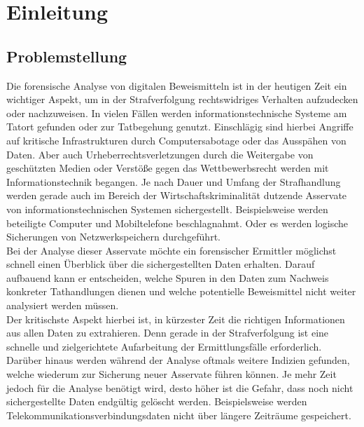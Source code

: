 
\chapter{Einleitung}
\label{ch:einleitung}

\section{Problemstellung}
Die forensische Analyse von digitalen Beweismitteln ist in der heutigen Zeit ein wichtiger Aspekt, um in der Strafverfolgung rechtswidriges Verhalten aufzudecken oder nachzuweisen. In vielen Fällen werden informationstechnische Systeme am Tatort gefunden oder zur Tatbegehung genutzt. Einschlägig sind hierbei Angriffe auf kritische Infrastrukturen durch Computersabotage oder das Ausspähen von Daten. Aber auch Urheberrechtsverletzungen durch die Weitergabe von geschützten Medien oder Verstöße gegen das Wettbewerbsrecht werden mit Informationstechnik begangen.
Je nach Dauer und Umfang der Strafhandlung werden gerade auch im Bereich der Wirtschaftskriminalität dutzende Asservate von informationstechnischen Systemen sichergestellt. Beispielsweise werden beteiligte Computer und Mobiltelefone beschlagnahmt. Oder es werden logische Sicherungen von Netzwerkspeichern durchgeführt.\\

\noindent
Bei der Analyse dieser Asservate möchte ein forensischer Ermittler möglichst schnell einen Überblick über die sichergestellten Daten erhalten. Darauf aufbauend kann er entscheiden, welche Spuren in den Daten zum Nachweis konkreter Tathandlungen dienen und welche potentielle Beweismittel nicht weiter analysiert werden müssen.\\

\noindent
Der kritischste Aspekt hierbei ist, in kürzester Zeit die richtigen Informationen aus allen Daten zu extrahieren. Denn gerade in der Strafverfolgung ist eine schnelle und zielgerichtete Aufarbeitung der Ermittlungsfälle erforderlich. Darüber hinaus werden während der Analyse oftmals weitere Indizien gefunden, welche wiederum zur Sicherung neuer Asservate führen können. Je mehr Zeit jedoch für die Analyse benötigt wird, desto höher ist die Gefahr, dass noch nicht sichergestellte Daten endgültig gelöscht werden. Beispielsweise werden Telekommunikationsverbindungsdaten nicht über längere Zeiträume gespeichert.\\

